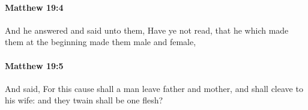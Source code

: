 		\paragraph{Matthew 19:4} %
			\label{MATTHEW-19-4}

			And he answered and said unto them, Have ye not read, that he which made them at the beginning made them male and female,

			\begin{framed}
			\scriptsize
				\begin{compactdesc}
					\item[SBLG] 
				\end{compactdesc}
			\end{framed}

		\paragraph{Matthew 19:5} %
			\label{MATTHEW-19-5}

			And said, For this cause shall a man leave father and mother, and shall cleave to his wife: and they twain shall be one flesh?

